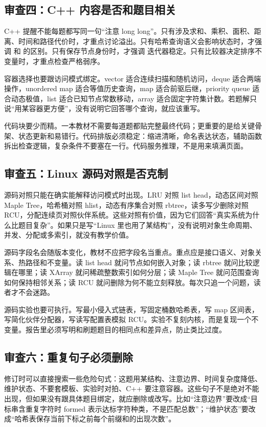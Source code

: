 \subsection{审查四：C++ 内容是否和题目相关}

C++ 提醒不能每题都写同一句“注意 long long”。只有涉及求和、乘积、面积、距离、时间和路径代价时，才重点讨论溢出。只有哈希查询语义会影响状态时，才强调  和  的区别。只有保存节点身份时，才强调  迭代器稳定。只有比较器决定排序不变量时，才重点检查严格弱序。

容器选择也要跟访问模式绑定。vector 适合连续扫描和随机访问，deque 适合两端操作，unordered map 适合等值历史查询，map 适合前驱后继，priority queue 适合动态极值，list 适合已知节点常数移动，array 适合固定字符集计数。若题解只说“用某容器更方便”，没有说明它回答哪个查询，就应该重写。

代码块要少而精。一本教材不需要每道题都贴完整最终代码；更重要的是给关键骨架、状态更新和易错行。代码排版必须稳定：缩进清晰，命名表达状态，辅助函数拆出检查逻辑，复杂条件不要塞在一行。代码服务推理，不是用来填满页面。

\subsection{审查五：Linux 源码对照是否克制}

源码对照只能在确实能解释访问模式时出现。LRU 对照 list head，动态区间对照 Maple Tree，哈希桶对照 hlist，动态有序集合对照 rbtree，读多写少删除对照 RCU，分配连续页对照伙伴系统。这些对照有价值，因为它们回答“真实系统为什么比题目复杂”。如果只是写“Linux 里也用了某结构”，没有说明对象生命周期、并发、分配或多索引，就没有教学价值。

源码字段名会随版本变化，教材不应把字段名当重点。重点应是接口语义、对象关系、热路径和不变量。读 list head 就问节点如何嵌入对象；读 rbtree 就问比较逻辑在哪里；读 XArray 就问稀疏整数索引如何分层；读 Maple Tree 就问范围查询如何保持相邻关系；读 RCU 就问删除为何不能立刻释放。每次只追一个问题，读者才不会迷路。

源码实验也要可执行。写最小侵入式链表，写固定桶数哈希表，写 map 区间表，写简化伙伴分配器，写读写配置表模拟 RCU。实验不复刻内核，而是复现一个不变量。报告里必须写明和刷题题目的相同点和差异点，防止类比过度。

\subsection{审查六：重复句子必须删除}

修订时可以直接搜索一些危险句式：这题用某结构、注意边界、时间复杂度降低、维护状态、不要套模板、实验时对拍、C++ 要注意容器。这些句子不是绝对不能出现，但如果没有跟具体题目绑定，就应删除或改写。比如“注意边界”要改成“目标串含重复字符时 formed 表示达标字符种类，不是匹配总数”；“维护状态”要改成“哈希表保存当前下标之前每个前缀和的出现次数”。

